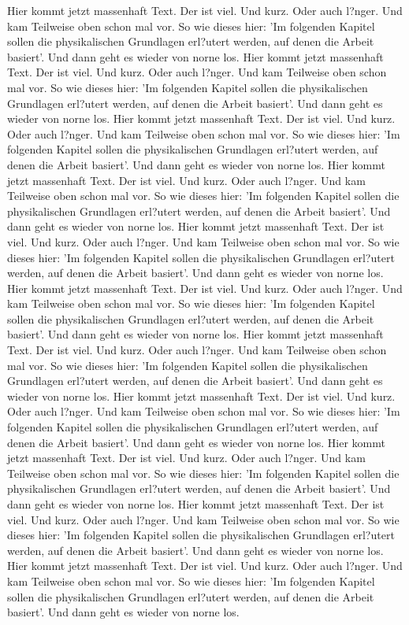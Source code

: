 Hier kommt jetzt massenhaft Text. Der ist viel. Und kurz. Oder auch l?nger. Und kam Teilweise oben schon mal vor. So wie dieses hier: 'Im folgenden Kapitel sollen die physikalischen Grundlagen erl?utert werden, auf denen die Arbeit basiert'.  Und dann geht es wieder von norne los. Hier kommt jetzt massenhaft Text. Der ist viel. Und kurz. Oder auch l?nger. Und kam Teilweise oben schon mal vor. So wie dieses hier: 'Im folgenden Kapitel sollen die physikalischen Grundlagen erl?utert werden, auf denen die Arbeit basiert'.  Und dann geht es wieder von norne los. Hier kommt jetzt massenhaft Text. Der ist viel. Und kurz. Oder auch l?nger. Und kam Teilweise oben schon mal vor. So wie dieses hier: 'Im folgenden Kapitel sollen die physikalischen Grundlagen erl?utert werden, auf denen die Arbeit basiert'.  Und dann geht es wieder von norne los. Hier kommt jetzt massenhaft Text. Der ist viel. Und kurz. Oder auch l?nger. Und kam Teilweise oben schon mal vor. So wie dieses hier: 'Im folgenden Kapitel sollen die physikalischen Grundlagen erl?utert werden, auf denen die Arbeit basiert'.  Und dann geht es wieder von norne los. Hier kommt jetzt massenhaft Text. Der ist viel. Und kurz. Oder auch l?nger. Und kam Teilweise oben schon mal vor. So wie dieses hier: 'Im folgenden Kapitel sollen die physikalischen Grundlagen erl?utert werden, auf denen die Arbeit basiert'.  Und dann geht es wieder von norne los. Hier kommt jetzt massenhaft Text. Der ist viel. Und kurz. Oder auch l?nger. Und kam Teilweise oben schon mal vor. So wie dieses hier: 'Im folgenden Kapitel sollen die physikalischen Grundlagen erl?utert werden, auf denen die Arbeit basiert'.  Und dann geht es wieder von norne los. Hier kommt jetzt massenhaft Text. Der ist viel. Und kurz. Oder auch l?nger. Und kam Teilweise oben schon mal vor. So wie dieses hier: 'Im folgenden Kapitel sollen die physikalischen Grundlagen erl?utert werden, auf denen die Arbeit basiert'.  Und dann geht es wieder von norne los. Hier kommt jetzt massenhaft Text. Der ist viel. Und kurz. Oder auch l?nger. Und kam Teilweise oben schon mal vor. So wie dieses hier: 'Im folgenden Kapitel sollen die physikalischen Grundlagen erl?utert werden, auf denen die Arbeit basiert'.  Und dann geht es wieder von norne los. Hier kommt jetzt massenhaft Text. Der ist viel. Und kurz. Oder auch l?nger. Und kam Teilweise oben schon mal vor. So wie dieses hier: 'Im folgenden Kapitel sollen die physikalischen Grundlagen erl?utert werden, auf denen die Arbeit basiert'.  Und dann geht es wieder von norne los. Hier kommt jetzt massenhaft Text. Der ist viel. Und kurz. Oder auch l?nger. Und kam Teilweise oben schon mal vor. So wie dieses hier: 'Im folgenden Kapitel sollen die physikalischen Grundlagen erl?utert werden, auf denen die Arbeit basiert'.  Und dann geht es wieder von norne los. Hier kommt jetzt massenhaft Text. Der ist viel. Und kurz. Oder auch l?nger. Und kam Teilweise oben schon mal vor. So wie dieses hier: 'Im folgenden Kapitel sollen die physikalischen Grundlagen erl?utert werden, auf denen die Arbeit basiert'.  Und dann geht es wieder von norne los. 
